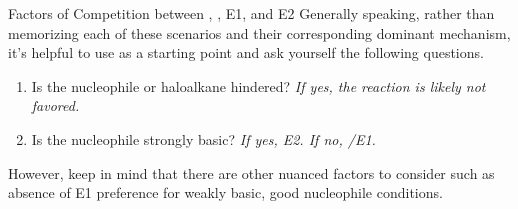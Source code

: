 \documentclass[10pt]{article}
\begin{document}
\begin{core}{Factors of Competition between \snt, \sno, E1, and E2}
    Generally speaking, rather than memorizing each of these scenarios and their corresponding dominant mechanism, it's helpful to use \snt as a starting point and ask yourself the following questions.

    \begin{enumerate}

      \item Is the nucleophile or haloalkane hindered? \textit{If yes, the \snt reaction is likely not favored.}

      \item Is the nucleophile strongly basic? \textit{If yes, E2. If no, \sno/E1.}
        
    \end{enumerate}

    However, keep in mind that there are other nuanced factors to consider such as absence of E1 preference for weakly basic, good nucleophile conditions.

  \end{core}
  
\end{document}
